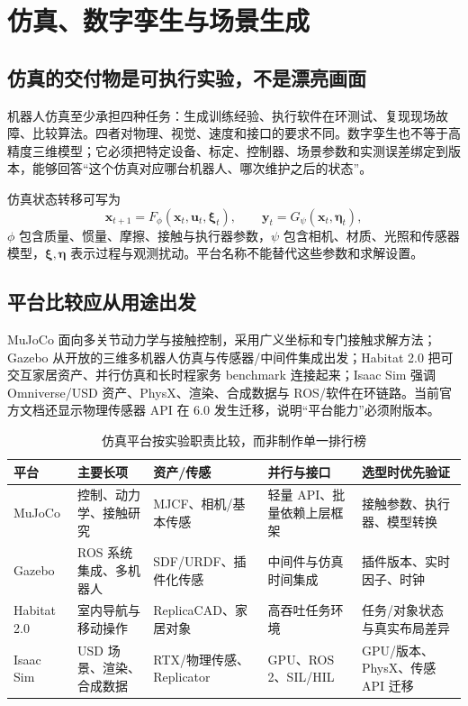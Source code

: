 \chapter{仿真、数字孪生与场景生成}
\label{chap:simulation-digital-twin}

\section{仿真的交付物是可执行实验，不是漂亮画面}

机器人仿真至少承担四种任务：生成训练经验、执行软件在环测试、复现现场故障、比较算法。四者对物理、视觉、速度和接口的要求不同。数字孪生也不等于高精度三维模型；它必须把特定设备、标定、控制器、场景参数和实测误差绑定到版本，能够回答“这个仿真对应哪台机器人、哪次维护之后的状态”。

仿真状态转移可写为
\begin{equation}
\boldsymbol x_{t+1}=F_{\phi}(\boldsymbol x_t,\boldsymbol u_t,\boldsymbol\xi_t),
\qquad \boldsymbol y_t=G_{\psi}(\boldsymbol x_t,\boldsymbol\eta_t),
\label{eq:simulator-model}
\end{equation}
$\phi$ 包含质量、惯量、摩擦、接触与执行器参数，$\psi$ 包含相机、材质、光照和传感器模型，$\boldsymbol\xi,\boldsymbol\eta$ 表示过程与观测扰动。平台名称不能替代这些参数和求解设置。

\section{平台比较应从用途出发}

\begingroup
{}
MuJoCo 面向多关节动力学与接触控制，采用广义坐标和专门接触求解方法\cite{todorov2012mujoco}；Gazebo 从开放的三维多机器人仿真与传感器/中间件集成出发\cite{koenig2004gazebo}；Habitat 2.0 把可交互家居资产、并行仿真和长时程家务 benchmark 连接起来\cite{szot2021habitat2}；Isaac Sim 强调 Omniverse/USD 资产、PhysX、渲染、合成数据与 ROS/软件在环链路。当前官方文档还显示物理传感器 API 在 6.0 发生迁移，说明“平台能力”必须附版本\cite{nvidia2026isaacsim}。

\begin{table}[H]
\centering
\caption{仿真平台按实验职责比较，而非制作单一排行榜}
\label{tab:simulator-comparison}
\begin{tabularx}{\textwidth}{p{}YYYY}
\toprule
平台 & 主要长项 & 资产/传感 & 并行与接口 & 选型时优先验证 \\
\midrule
MuJoCo & 控制、动力学、接触研究 & MJCF、相机/基本传感 & 轻量 API、批量依赖上层框架 & 接触参数、执行器、模型转换 \\
Gazebo & ROS 系统集成、多机器人 & SDF/URDF、插件化传感 & 中间件与仿真时间集成 & 插件版本、实时因子、时钟 \\
Habitat 2.0 & 室内导航与移动操作 & ReplicaCAD、家居对象 & 高吞吐任务环境 & 任务/对象状态与真实布局差异 \\
Isaac Sim & USD 场景、渲染、合成数据 & RTX/物理传感、Replicator & GPU、ROS 2、SIL/HIL & GPU/版本、PhysX、传感 API 迁移 \\
\bottomrule
\end{tabularx}
\end{table}
\endgroup

